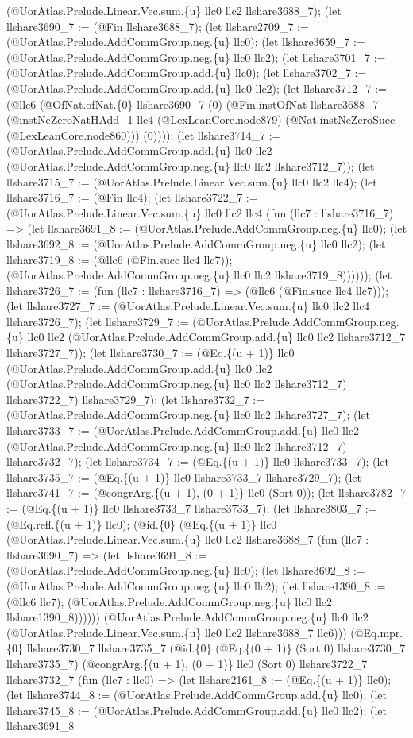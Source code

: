 \documentclass[11pt]{article}
\begin{document}
(@UorAtlas.Prelude.Linear.Vec.sum.\{u\} llc0 llc2 llshare3688\_7); (let llshare3690\_7 := (@Fin llshare3688\_7); (let llshare2709\_7 := (@UorAtlas.Prelude.AddCommGroup.neg.\{u\} llc0); (let llshare3659\_7 := (@UorAtlas.Prelude.AddCommGroup.neg.\{u\} llc0 llc2); (let llshare3701\_7 := (@UorAtlas.Prelude.AddCommGroup.add.\{u\} llc0); (let llshare3702\_7 := (@UorAtlas.Prelude.AddCommGroup.add.\{u\} llc0 llc2); (let llshare3712\_7 := (@llc6 (@OfNat.ofNat.\{0\} llshare3690\_7 (0) (@Fin.instOfNat llshare3688\_7 (@instNeZeroNatHAdd\_1 llc4 (@LexLeanCore.node879) (@Nat.instNeZeroSucc (@LexLeanCore.node860))) (0)))); (let llshare3714\_7 := (@UorAtlas.Prelude.AddCommGroup.add.\{u\} llc0 llc2 (@UorAtlas.Prelude.AddCommGroup.neg.\{u\} llc0 llc2 llshare3712\_7)); (let llshare3715\_7 := (@UorAtlas.Prelude.Linear.Vec.sum.\{u\} llc0 llc2 llc4); (let llshare3716\_7 := (@Fin llc4); (let llshare3722\_7 := (@UorAtlas.Prelude.Linear.Vec.sum.\{u\} llc0 llc2 llc4 (fun (llc7 : llshare3716\_7) => (let llshare3691\_8 := (@UorAtlas.Prelude.AddCommGroup.neg.\{u\} llc0); (let llshare3692\_8 := (@UorAtlas.Prelude.AddCommGroup.neg.\{u\} llc0 llc2); (let llshare3719\_8 := (@llc6 (@Fin.succ llc4 llc7)); (@UorAtlas.Prelude.AddCommGroup.neg.\{u\} llc0 llc2 llshare3719\_8)))))); (let llshare3726\_7 := (fun (llc7 : llshare3716\_7) => (@llc6 (@Fin.succ llc4 llc7))); (let llshare3727\_7 := (@UorAtlas.Prelude.Linear.Vec.sum.\{u\} llc0 llc2 llc4 llshare3726\_7); (let llshare3729\_7 := (@UorAtlas.Prelude.AddCommGroup.neg.\{u\} llc0 llc2 (@UorAtlas.Prelude.AddCommGroup.add.\{u\} llc0 llc2 llshare3712\_7 llshare3727\_7)); (let llshare3730\_7 := (@Eq.\{(u + 1)\} llc0 (@UorAtlas.Prelude.AddCommGroup.add.\{u\} llc0 llc2 (@UorAtlas.Prelude.AddCommGroup.neg.\{u\} llc0 llc2 llshare3712\_7) llshare3722\_7) llshare3729\_7); (let llshare3732\_7 := (@UorAtlas.Prelude.AddCommGroup.neg.\{u\} llc0 llc2 llshare3727\_7); (let llshare3733\_7 := (@UorAtlas.Prelude.AddCommGroup.add.\{u\} llc0 llc2 (@UorAtlas.Prelude.AddCommGroup.neg.\{u\} llc0 llc2 llshare3712\_7) llshare3732\_7); (let llshare3734\_7 := (@Eq.\{(u + 1)\} llc0 llshare3733\_7); (let llshare3735\_7 := (@Eq.\{(u + 1)\} llc0 llshare3733\_7 llshare3729\_7); (let llshare3741\_7 := (@congrArg.\{(u + 1), (0 + 1)\} llc0 (Sort 0)); (let llshare3782\_7 := (@Eq.\{(u + 1)\} llc0 llshare3733\_7 llshare3733\_7); (let llshare3803\_7 := (@Eq.refl.\{(u + 1)\} llc0); (@id.\{0\} (@Eq.\{(u + 1)\} llc0 (@UorAtlas.Prelude.Linear.Vec.sum.\{u\} llc0 llc2 llshare3688\_7 (fun (llc7 : llshare3690\_7) => (let llshare3691\_8 := (@UorAtlas.Prelude.AddCommGroup.neg.\{u\} llc0); (let llshare3692\_8 := (@UorAtlas.Prelude.AddCommGroup.neg.\{u\} llc0 llc2); (let llshare1390\_8 := (@llc6 llc7); (@UorAtlas.Prelude.AddCommGroup.neg.\{u\} llc0 llc2 llshare1390\_8)))))) (@UorAtlas.Prelude.AddCommGroup.neg.\{u\} llc0 llc2 (@UorAtlas.Prelude.Linear.Vec.sum.\{u\} llc0 llc2 llshare3688\_7 llc6))) (@Eq.mpr.\{0\} llshare3730\_7 llshare3735\_7 (@id.\{0\} (@Eq.\{(0 + 1)\} (Sort 0) llshare3730\_7 llshare3735\_7) (@congrArg.\{(u + 1), (0 + 1)\} llc0 (Sort 0) llshare3722\_7 llshare3732\_7 (fun (llc7 : llc0) => (let llshare2161\_8 := (@Eq.\{(u + 1)\} llc0); (let llshare3744\_8 := (@UorAtlas.Prelude.AddCommGroup.add.\{u\} llc0); (let llshare3745\_8 := (@UorAtlas.Prelude.AddCommGroup.add.\{u\} llc0 llc2); (let llshare3691\_8 
\end{document}
